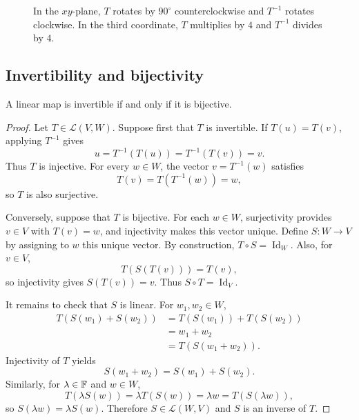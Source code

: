 \begin{figure}[htbp]
  \centering
  \caption{In the $xy$-plane, $T$ rotates by $90^\circ$
    counterclockwise and $T^{-1}$ rotates clockwise. In the third
    coordinate, $T$ multiplies by $4$ and $T^{-1}$ divides by $4$.}
  \label{fig:rotation-inverse}
\end{figure}

\subsection{Invertibility and bijectivity}

\begin{proposition}\label{prop:invertible-iff-bijective}
  A linear map is invertible if and only if it is bijective.
\end{proposition}

\begin{proof}
  Let $T\in\mathcal L(V,W)$. Suppose first that $T$ is invertible.
  If $T(u)=T(v)$, applying $T^{-1}$ gives
  \[
    u=T^{-1}(T(u))=T^{-1}(T(v))=v.
  \]
  Thus $T$ is injective. For every $w\in W$, the vector
  $v=T^{-1}(w)$ satisfies
  \[
    T(v)=T(T^{-1}(w))=w,
  \]
  so $T$ is also surjective.

  Conversely, suppose that $T$ is bijective. For each $w\in W$,
  surjectivity provides $v\in V$ with $T(v)=w$, and injectivity
  makes this vector unique. Define $S\colon W\to V$ by assigning
  to $w$ this unique vector. By construction,
  $T\circ S=\operatorname{Id}_W$. Also, for $v\in V$,
  \[
    T(S(T(v)))=T(v),
  \]
  so injectivity gives $S(T(v))=v$. Thus
  $S\circ T=\operatorname{Id}_V$.

  It remains to check that $S$ is linear. For $w_1,w_2\in W$,
  \begin{align*}
    T(S(w_1)+S(w_2))
      &=T(S(w_1))+T(S(w_2)) \\
      &=w_1+w_2 \\
      &=T(S(w_1+w_2)).
  \end{align*}
  Injectivity of $T$ yields
  \[
    S(w_1+w_2)=S(w_1)+S(w_2).
  \]
  Similarly, for $\lambda\in\mathbb{F}$ and $w\in W$,
  \[
    T(\lambda S(w))=\lambda T(S(w))=\lambda w=T(S(\lambda w)),
  \]
  so $S(\lambda w)=\lambda S(w)$. Therefore
  $S\in\mathcal L(W,V)$ and $S$ is an inverse of $T$.
\end{proof}

